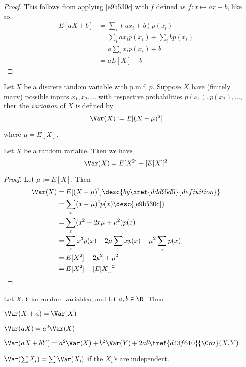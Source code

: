 \begin{proof}
  This follows from applying \autoref{e9b530c} with $f$ defined as
  $f:x\mapsto ax+b$, like so.
  \begin{align*}
    E[aX+b] &=\sum_{i}(ax_i+b)p(x_i)             \\
            &=\sum_{i}ax_ip(x_i)+\sum_{i}bp(x_i) \\
            &=a\sum_{i}x_ip(x_i)+b               \\
            &=aE[X]+b
  \end{align*}
\end{proof}

\label{ddd95d5}

Let $X$ be a discrete random variable with \href{bcef5f1}{p.m.f.} $p$. Suppose
$X$ have (finitely many) possible inputs $x_1,x_2,\ldots$ with respective
probabilities $p(x_1),p(x_2),\ldots$, then the \textit{variation} of $X$ is
defined by
$$
  \Var(X):=E[(X-\mu)^2]
$$

where $\mu=E[X]$.

\label{f178eb7}

Let $X$ be a random variable. Then we have
$$
  \Var(X)=E[X^2]-[E[X]]^2
$$

\begin{proof}
  Let $\mu:=E[X]$. Then
  \begin{align*}
    \Var(X) &=E[(X-\mu)^2]\desc{by \href{ddd95d5}{definition}} \\
            &=\sum_x(x-\mu)^2p(x)\desc{\autoref{e9b530c}}      \\
            &=\sum_x(x^2-2x\mu+\mu^2)p(x)                      \\
            &=\sum_xx^2p(x)-2\mu\sum_xxp(x)+\mu^2\sum_xp(x)    \\
            &=E[X^2]-2\mu^2+\mu^2                              \\
            &=E[X^2]-[E[X]]^2
  \end{align*}
\end{proof}

\label{c9586b8}

Let $X,Y$ be random variables, and let $a,b\in\R$. Then
\begin{enumerata}
  \item $\Var(X+a)=\Var(X)$
  \item $\Var(aX)=a^2\Var(X)$
  \item $\Var(aX+bY)=a^2\Var(X)+b^2\Var(Y)+2ab\href{d43f610}{\Cov}(X,Y)$
  \item $\Var(\sum X_i)=\sum\Var(X_i)$ if the $X_i$'s are \href{f0da4c0}{independent}.
\end{enumerata}

